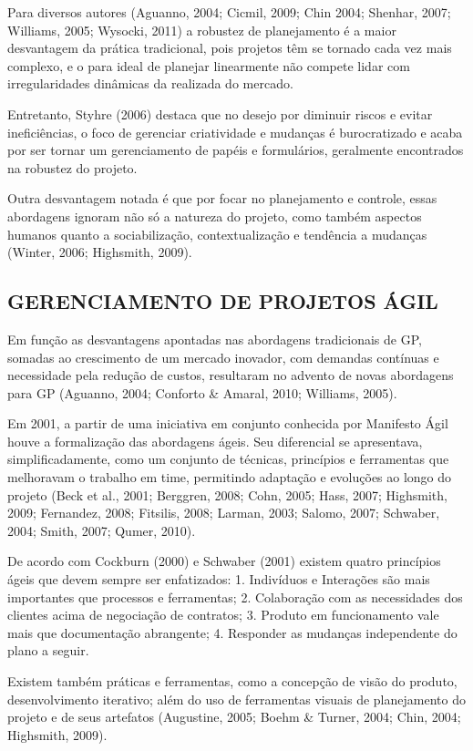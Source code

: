 Para diversos autores (Aguanno, 2004; Cicmil, 2009; Chin 2004; Shenhar, 2007; Williams, 2005; Wysocki, 2011) a robustez de planejamento é a maior desvantagem da prática tradicional, pois projetos têm se tornado cada vez mais complexo, e o para ideal de planejar linearmente não compete lidar com irregularidades dinâmicas da realizada do mercado.

Entretanto, Styhre (2006) destaca que no desejo por diminuir riscos e evitar ineficiências, o foco de gerenciar criatividade e mudanças é burocratizado e acaba por ser tornar um gerenciamento de papéis e formulários, geralmente encontrados na robustez do projeto.

Outra desvantagem notada é que por focar no planejamento e controle, essas abordagens ignoram não só a natureza do projeto, como também aspectos humanos quanto a sociabilização, contextualização e tendência a mudanças (Winter, 2006; Highsmith, 2009).

\subsection{GERENCIAMENTO DE PROJETOS ÁGIL}

Em função as desvantagens apontadas nas abordagens tradicionais de GP, somadas ao crescimento de um mercado inovador, com demandas contínuas e necessidade pela redução de custos, resultaram no advento de novas abordagens para GP (Aguanno, 2004; Conforto \& Amaral, 2010; Williams, 2005).

Em 2001, a partir de uma iniciativa em conjunto conhecida por Manifesto Ágil houve a formalização das abordagens ágeis. Seu diferencial se apresentava, simplificadamente, como um conjunto de técnicas, princípios e ferramentas que melhoravam o trabalho em time, permitindo adaptação e evoluções ao longo do projeto (Beck et al., 2001; Berggren, 2008; Cohn, 2005; Hass, 2007; Highsmith, 2009; Fernandez, 2008; Fitsilis, 2008; Larman, 2003; Salomo, 2007; Schwaber, 2004; Smith, 2007; Qumer, 2010).

De acordo com Cockburn (2000) e Schwaber (2001) existem quatro princípios ágeis que devem sempre ser enfatizados:
1. Indivíduos e Interações são mais importantes que processos e ferramentas;
2. Colaboração com as necessidades dos clientes acima de negociação de contratos;
3. Produto em funcionamento vale mais que documentação abrangente;
4. Responder as mudanças independente do plano a seguir.

Existem também práticas e ferramentas, como a concepção de visão do produto, desenvolvimento iterativo; além do uso de ferramentas visuais de planejamento do projeto e de seus artefatos (Augustine, 2005; Boehm \& Turner, 2004; Chin, 2004; Highsmith, 2009).

